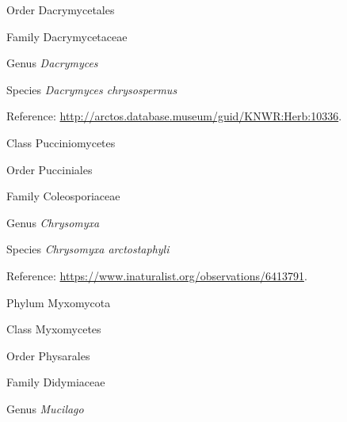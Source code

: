 \documentclass[9pt, article]{memoir}
\begin{document}
\begin{multicols}{2}
\vspace{6pt}\noindent\hspace{18pt}Order Dacrymycetales


\vspace{6pt}\noindent\hspace{24pt}Family Dacrymycetaceae


\vspace{6pt}\noindent\hspace{30pt}Genus \textit{Dacrymyces}


\vspace{6pt}\noindent\hspace{36pt}Species \textit{Dacrymyces chrysospermus}


Reference: 
\url{http://arctos.database.museum/guid/KNWR:Herb:10336}.

\vspace{6pt}\noindent\hspace{12pt}Class Pucciniomycetes


\vspace{6pt}\noindent\hspace{18pt}Order Pucciniales


\vspace{6pt}\noindent\hspace{24pt}Family Coleosporiaceae


\vspace{6pt}\noindent\hspace{30pt}Genus \textit{Chrysomyxa}


\vspace{6pt}\noindent\hspace{36pt}Species \textit{Chrysomyxa arctostaphyli}


Reference: 
\url{https://www.inaturalist.org/observations/6413791}.

\vspace{6pt}\noindent\hspace{6pt}Phylum Myxomycota


\vspace{6pt}\noindent\hspace{12pt}Class Myxomycetes


\vspace{6pt}\noindent\hspace{18pt}Order Physarales


\vspace{6pt}\noindent\hspace{24pt}Family Didymiaceae


\vspace{6pt}\noindent\hspace{30pt}Genus \textit{Mucilago}



\end{multicols}
\end{document}

